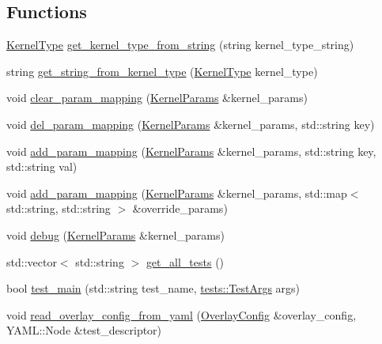 \subsection*{Functions}
\begin{DoxyCompactItemize}
\item 
\hyperlink{namespacetests_a4f360b8af533762256ff97513bfd6a0d}{Kernel\+Type} \hyperlink{namespacetests_a6596994244a2884f6810ad1592c25c36}{get\+\_\+kernel\+\_\+type\+\_\+from\+\_\+string} (string kernel\+\_\+type\+\_\+string)
\item 
string \hyperlink{namespacetests_ad75f85658266305d587bfb6795c1922e}{get\+\_\+string\+\_\+from\+\_\+kernel\+\_\+type} (\hyperlink{namespacetests_a4f360b8af533762256ff97513bfd6a0d}{Kernel\+Type} kernel\+\_\+type)
\item 
void \hyperlink{namespacetests_a669b08c547907fe0dcb3219b3b8142c7}{clear\+\_\+param\+\_\+mapping} (\hyperlink{structtests_1_1KernelParams}{Kernel\+Params} \&kernel\+\_\+params)
\item 
void \hyperlink{namespacetests_ac5d7bfff1d97fa0a9d6e5f7694a88921}{del\+\_\+param\+\_\+mapping} (\hyperlink{structtests_1_1KernelParams}{Kernel\+Params} \&kernel\+\_\+params, std\+::string key)
\item 
void \hyperlink{namespacetests_a3ea8820101481a77d967610403ccd49d}{add\+\_\+param\+\_\+mapping} (\hyperlink{structtests_1_1KernelParams}{Kernel\+Params} \&kernel\+\_\+params, std\+::string key, std\+::string val)
\item 
void \hyperlink{namespacetests_afa125cd17bd8f15a205cfa001c0cc0d9}{add\+\_\+param\+\_\+mapping} (\hyperlink{structtests_1_1KernelParams}{Kernel\+Params} \&kernel\+\_\+params, std\+::map$<$ std\+::string, std\+::string $>$ \&override\+\_\+params)
\item 
void \hyperlink{namespacetests_aba02a7b523ddea64948c65e3d8721ec9}{debug} (\hyperlink{structtests_1_1KernelParams}{Kernel\+Params} \&kernel\+\_\+params)
\item 
std\+::vector$<$ std\+::string $>$ \hyperlink{namespacetests_ae7885014fe584723c6327a6d05713708}{get\+\_\+all\+\_\+tests} ()
\item 
bool \hyperlink{namespacetests_a124130b57e269bc86797bf0ab02e9c24}{test\+\_\+main} (std\+::string test\+\_\+name, \hyperlink{structtests_1_1TestArgs}{tests\+::\+Test\+Args} args)
\item 
void \hyperlink{namespacetests_a6515d12a8b88dec9d8a56bc221672fd6}{read\+\_\+overlay\+\_\+config\+\_\+from\+\_\+yaml} (\hyperlink{structtests_1_1OverlayConfig}{Overlay\+Config} \&overlay\+\_\+config, Y\+A\+M\+L\+::\+Node \&test\+\_\+descriptor)

\end{DoxyCompactItemize}
